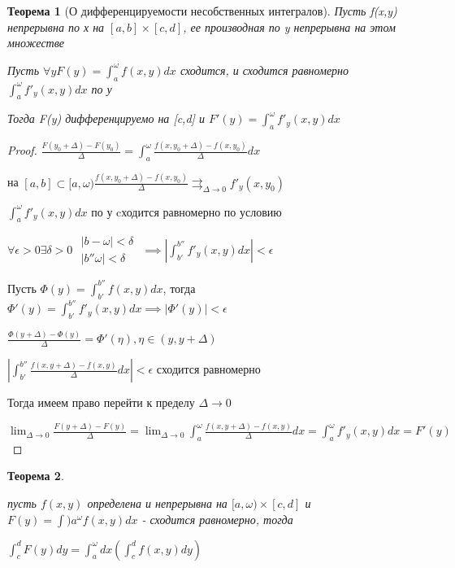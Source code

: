 \documentclass[a4paper, 12pt]{article}
\newtheorem{theorem}{Теорема}[section]
\theoremstyle{definition}
\theoremstyle{remark}
\begin{document}
\begin{theorem}[О дифференцируемости несобственных интегралов]
     Пусть f(x,y) непрерывна по х на $[a,b] \times [c,d]$, ее производная по y непрерывна на этом множестве

     Пусть $\forall y F(y) = \int_a^\omega f(x,y )dx$ сходится, и сходится равномерно $\int_a^\omega f'_y(x,y )dx$ по у

     Тогда F(y) дифференцируемо на [c,d] и $F'(y) = \int_a^\omega  f'_y(x,y)dx$
\end{theorem}

\begin{proof}
     $\frac{F(y_0+\Delta) - F(y_0)}{\Delta} = \int_a^\omega\frac{f(x, y_0 +\Delta) - f(x, y_0)}{\Delta}dx$

     на $[a,b] \subset [a,\omega) \frac{f(x, y_0 +\Delta) - f(x, y_0)}{\Delta}\rightrightarrows_{\Delta\to 0}f'_y(x,y_0)$

     $\int_a^\omega f'_y(x,y )dx$ по у cходится равномерно по условию

     $\forall \epsilon > 0\exists \delta > 0$
     $
     \begin{array}{l}
          |b - \omega|< \delta\\
          |b'' \omega|<\delta
     \end{array}
     $
     $\implies |\int_{b'}^{b''} f'_y(x,y)dx|< \epsilon$

     Пусть $\Phi(y) = \int_{b'}^{b''}f(x,y)dx$, тогда $\Phi'(y) = \int_{b'}^{b''}f'_y(x,y)dx\implies |\Phi'(y)|<\epsilon$

     $\frac{\Phi(y+\Delta) - \Phi(y)}{\Delta} = \Phi'(\eta ), \eta \in (y, y+ \Delta)$

     $|\int_{b'}^{b''} \frac{f(x, y +\Delta) - f(x, y)}{\Delta}dx|<\epsilon$ сходится равномерно

     Тогда имеем право перейти к пределу $\Delta \to 0$

     $\lim_{\Delta\to 0}\frac{F(y + \Delta) - F(y)}{\Delta} = \lim_{\Delta\to 0} \int_a^\omega \frac{f(x, y+\Delta) - f(x,y) }{\Delta}dx=\int_a^\omega f'_y(x,y)dx = F'(y)$


\end{proof}

\begin{theorem} \hypertarget{p3}{}
     пусть $f(x,y)$ определена и непрерывна на $[a,\omega)\times[c,d]$ и $F(y)=\int)a^\omega f(x,y)dx$ - сходится равномерно, тогда

     $\int_c^d F(y)dy = \int_a^\omega dx(\int_c^d f(x,y)dy)$
\end{theorem}
\end{document}
